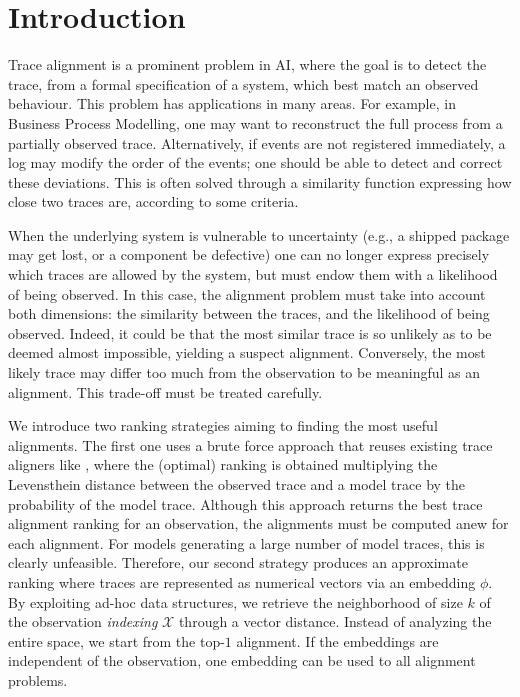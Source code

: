 
\section{Introduction}
\label{introduction}

Trace alignment is a prominent problem in AI, where the goal is to detect the trace, from a formal specification of a system,
which best match an observed behaviour. This problem has applications in many areas. For example, in Business Process Modelling, 
one may want to reconstruct the full process from a partially observed trace. Alternatively, if events are not registered immediately,
a log may modify the order of the events; one should be able to detect and correct these deviations. This is often solved 
through a similarity function expressing how close two traces are, according to some criteria.

When the underlying system is vulnerable to uncertainty (e.g., a shipped package may get lost, or a component be defective)
one can no longer express precisely which traces are allowed by the system, but must endow them with a likelihood
of being observed. In this case, the alignment problem must take into account both dimensions: the similarity between the
traces, and the likelihood of being observed. Indeed, it could be that the most similar trace is so unlikely as to be deemed almost
impossible, yielding a suspect alignment. Conversely, the most likely trace may differ too much from the observation to be
meaningful as an alignment. This trade-off must be treated carefully.

We introduce two ranking strategies aiming to finding the most useful alignments. The first one uses a brute force approach that 
reuses existing trace aligners like \cite{DBLP:conf/edoc/AdriansyahDA11,LeoniM17}, where the (optimal) ranking 
is obtained multiplying the Levensthein distance between the observed trace and a model trace by the probability of the 
model trace. Although this approach returns the best trace alignment ranking for an observation, the alignments must be computed 
anew for each alignment. For models generating a large number of model traces, this is clearly unfeasible. Therefore, our second 
strategy produces an approximate ranking where traces are represented as numerical vectors via an embedding $\phi$. 
By exploiting ad-hoc data structures, we retrieve the neighborhood of size $k$ of the observation \textit{indexing} $\mathcal{X}$ 
through a vector distance. Instead of analyzing the entire space, we start from the top-$1$ alignment. If the embeddings are 
independent of the observation, one embedding can be used to all alignment problems.


